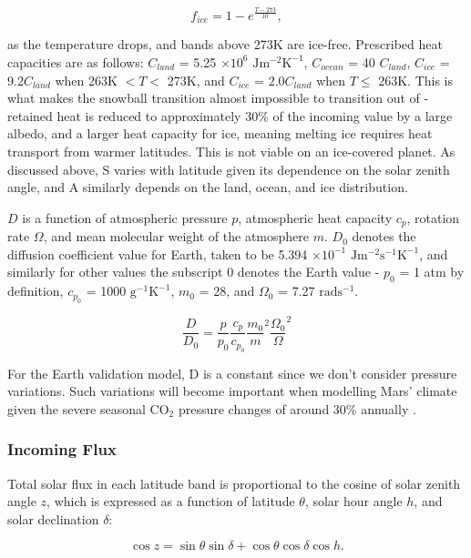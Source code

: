 \documentclass[12pt,onecolumn]{revtex4-2}    %
\begin{document}
\begin{equation}
f_{ice} = 1 - e^{\frac{T-273}{10}},
\end{equation}

as the temperature drops, and bands above 273K are ice-free. Prescribed heat capacities are as follows: $C_{land}$ = 5.25 $\times 10^{6}$ $\mathrm{Jm^{-2}K^{-1}}$, $C_{ocean}$ = 40 $C_{land}$, $C_{ice}$ = 9.2$C_{land}$ when 263K $< T <$ 273K, and $C_{ice}$ = 2.0$C_{land}$ when $T \le$ 263K. This is what makes the snowball transition almost impossible to transition out of - retained heat is reduced to approximately 30\% of the incoming value by a large albedo, and a larger heat capacity for ice, meaning melting ice requires heat transport from warmer latitudes. This is not viable on an ice-covered planet. As discussed above, S varies with latitude given its dependence on the solar zenith angle, and A similarly depends on the land, ocean, and ice distribution. 
\

$D$ is a function of atmospheric pressure $p$, atmospheric heat capacity $c_{p}$, rotation rate $\Omega$, and mean molecular weight of the atmosphere $m$. $D_{0}$ denotes the diffusion coefficient value for Earth, taken to be 5.394 $\times 10^{-1}$ $\mathrm{J m^{-2} s^{-1} K^{-1}}$, and similarly for other values the subscript 0 denotes the Earth value - $p_{0}$ = 1 atm by definition, $c_{p_{0}}$ = 1000 $\mathrm{g^{-1}K^{-1}}$, $m_{0}$ = 28, and $\Omega_{0}$ = 7.27 $\mathrm{rad s^{-1}}$.

\begin{equation}
\frac{D}{D_{0}} = \frac{p}{p_{0}} \frac{c_{p}}{c_{p_{0}}} {\frac{m_{0}}{m}}^{2} {\frac{\Omega_{0}}{\Omega}}^{2}
\end{equation}

For the Earth validation model, D is a constant since we don't consider pressure variations. Such variations will become important when modelling Mars' climate given the severe seasonal $\mathrm{CO_2}$ pressure changes of around 30\% annually \cite{FHT98}.

\subsubsection{Incoming Flux}

Total solar flux in each latitude band is proportional to the cosine of solar zenith angle $z$, which is expressed  as a function of latitude $\theta$, solar hour angle $h$, and solar declination $\delta$:

\begin{equation}
\cos z = \sin \theta \sin \delta + \cos \theta \cos \delta \cos h.
\end{equation}
\end{document}
